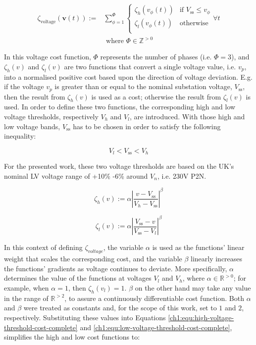 \begin{equation}
\begin{split}
	\zeta_\text{voltage}(\textbf{v}(t)) :=& \sum_{\phi=1}^{\Phi}{\begin{cases}
		\zeta_h(v_{\phi}(t)) & \text{if } V_\text{ss} \leq v_\phi\\
		\zeta_l(v_{\phi}(t)) & \text{otherwise}\\
	\end{cases}} \forall t\\
	&\text{ where } \Phi \in \mathbb{Z}^{>0}
\end{split}
\label{ch1:equ:voltage-deviation}
\end{equation}

In this voltage cost function, $\Phi$ represents the number of phases (i.e. $\Phi = 3$), and $\zeta_h(v)$ and $\zeta_l(v)$ are two functions that convert a single voltage value, i.e. $v_p$, into a normalised positive cost based upon the direction of voltage deviation.
E.g. if the voltage $v_p$ is greater than or equal to the nominal substation voltage, $V_\text{ss}$, then the result from $\zeta_h(v)$ is used as a cost; otherwise the result from $\zeta_l(v)$ is used.
In order to define these two functions, the corresponding high and low voltage thresholds, respectively $V_h$ and $V_l$, are introduced.
With those high and low voltage bands, $V_\text{ss}$ has to be chosen in order to satisfy the following inequality:

\begin{equation}
	V_l < V_\text{ss} < V_h
\end{equation}

For the presented work, these two voltage thresholds are based on the UK's nominal LV voltage range of +10\% -6\% around $V_n$, i.e. 230V P2N.

\begin{equation}
	\zeta_h(v) := \alpha \left|\frac{v-V_\text{ss}}{V_h-V_\text{ss}}\right|^{\beta}
	\label{ch1:equ:high-voltage-threshold-cost-complete}
\end{equation}

\begin{equation}
	\zeta_l(v) := \alpha \left|\frac{V_\text{ss}-v}{V_\text{ss}-V_l}\right|^{\beta}
	\label{ch1:equ:low-voltage-threshold-cost-complete}
\end{equation}

In this context of defining $\zeta_{voltage}$, the variable $\alpha$ is used as the functions' linear weight that scales the corresponding cost, and the variable $\beta$ linearly increases the functions' gradients as voltage continues to deviate.
More specifically, $\alpha$ determines the value of the functions at voltages $V_l$ and $V_h$, where $\alpha \in \mathbb{R}^{>0}$; for example, when $\alpha = 1$, then $\zeta_{h}(v_l) = 1$.
$\beta$ on the other hand may take any value in the range of $\mathbb{R}^{>2}$, to assure a continuously differentiable cost function.
Both $\alpha$ and $\beta$ were treated as constants and, for the scope of this work, set to $1$ and $2$, respectively.
Substituting these values into Equations \ref{ch1:equ:high-voltage-threshold-cost-complete} and \ref{ch1:equ:low-voltage-threshold-cost-complete}, simplifies the high and low cost functions to:

